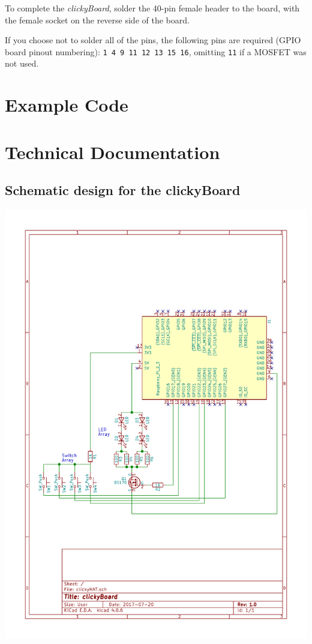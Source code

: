 \documentclass[10pt, a4paper, onesided]{article}
\begin{document}
		To complete the \textit{clickyBoard}, solder the 40-pin female header to the board, with the female socket on the reverse side of the board.
		
		If you choose not to solder all of the pins, the following pins are required (GPIO board pinout numbering): 
		\texttt{1 4 9 11 12 13 15 16}, omitting \texttt{11} if a MOSFET was not used.



\section{Example Code}

\section{Technical Documentation}
	\subsection{Schematic design for the clickyBoard}
		\begin{center}
			\includegraphics[width=1\linewidth]{img/schematic}
		\end{center}
	
\end{document}
